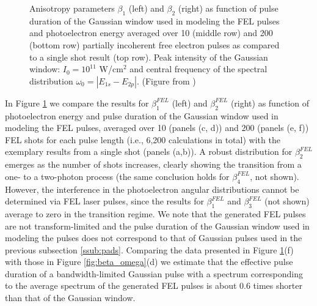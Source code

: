 \begin{figure}[!ht]
\caption{
Anisotropy parameters $\beta_1$ (left) and $\beta_2$ (right) as function of pulse duration of the Gaussian window used in modeling the FEL pulses and photoelectron energy averaged over 10 (middle row) and 200 (bottom row) partially incoherent free electron pulses as compared to a single shot result (top row). Peak intensity of the Gaussian window: $I_{0} = 10^{11}$ W/cm$^2$ 
and central frequency of the spectral distribution $\omega_0 = |E_{1s}-E_{2p}|$. (Figure from \cite{venzke2020_ionization})
} 
  \label{fig:beta-variation-FEL}
\end{figure}

In Figure \ref{fig:beta-variation-FEL} we compare the results for $\beta_1^{FEL}$ (left) and $\beta_2^{FEL}$ (right) as function of photoelectron energy and pulse duration of the Gaussian window used in modeling the FEL pulses, averaged over 10 (panels (c, d)) and 200 (panels (e, f)) FEL shots for each pulse length (i.e., 6,200 calculations in total) with the exemplary results from a single shot (panels (a,b)). A robust distribution for $\beta_2^{FEL}$ emerges as the number of shots increases, clearly showing the transition from a one- to a two-photon process (the same conclusion holds for $\beta_4^{FEL}$, not shown). However, the interference in the photoelectron angular distributions cannot be determined via FEL laser pulses, since the results for $\beta_1^{FEL}$ and $\beta_3^{FEL}$ (not shown) average to zero in the transition regime. 
We note that the generated FEL pulses are not transform-limited and the pulse duration of the Gaussian window used in modeling the pulses does not correspond to that of Gaussian pulses used in the previous subsection
\ref{ssub:pads}.
Comparing the data presented in Figure \ref{fig:beta-variation-FEL}(f) with those in Figure \ref{fig:beta_omega}(d) we estimate that the effective pulse duration of a bandwidth-limited Gaussian pulse with a spectrum corresponding to the average spectrum of the generated FEL pulses is about 0.6 times shorter than that of the Gaussian window.


